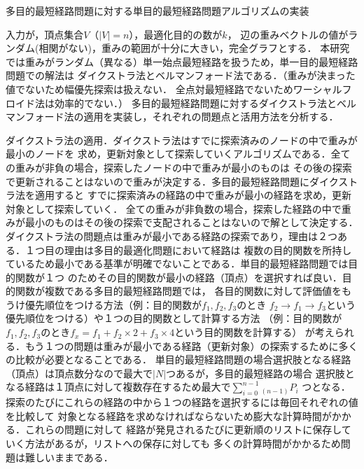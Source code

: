 \documentclass[12pt]{optlab-bachelor}
\begin{document}
\begin{description}
  \item[多目的最短経路問題に対する単目的最短経路問題アルゴリズムの実装]
\end{description}

入力が，頂点集合$V$（$|V|=n$），最適化目的の数が$k$，
辺の重みベクトルの値がランダム(相関がない)，重みの範囲が十分に大きい，完全グラフとする．
本研究では重みがランダム（異なる）単一始点最短経路を扱うため，単一目的最短経路問題での解法は
ダイクストラ法とベルマンフォード法である．（重みが決まった値でないため幅優先探索は扱えない．
全点対最短経路でないためワーシャルフロイド法は効率的でない．）
多目的最短経路問題に対するダイクストラ法とベルマンフォード法の適用を実装し，それぞれの問題点と活用方法を分析する．

ダイクストラ法の適用．ダイクストラ法はすでに探索済みのノードの中で重みが最小のノードを
求め，更新対象として探索していくアルゴリズムである．全ての重みが非負の場合，探索したノードの中で重みが最小のものは
その後の探索で更新されることはないので重みが決定する．多目的最短経路問題にダイクストラ法を適用すると
すでに探索済みの経路の中で重みが最小の経路を求め，更新対象として探索していく．
全ての重みが非負数の場合，探索した経路の中で重みが最小のものはその後の探索で支配されることはないので解として決定する．
ダイクストラ法の問題点は重みが最小である経路の探索であり，理由は２つある．１つ目の理由は多目的最適化問題において経路は
複数の目的関数を所持しているため最小である基準が明確でないことである．単目的最短経路問題では目的関数が１つ
のためその目的関数が最小の経路（頂点）を選択すれば良い．目的関数が複数である多目的最短経路問題では，
各目的関数に対して評価値をもうけ優先順位をつける方法（例：目的関数が$f_1,f_2,f_3$のとき
$f_2 \rightarrow f_1 \rightarrow f_3 $という優先順位をつける）や１つの目的関数として計算する方法
（例：目的関数が$f_1,f_2,f_3$のとき$f_x = f_1 + f_2 \times 2 + f_3 \times 4$という目的関数を計算する）
が考えられる．もう１つの問題は重みが最小である経路（更新対象）の探索するために多くの比較が必要となることである．
単目的最短経路問題の場合選択肢となる経路（頂点）は頂点数分なので最大で$|N|$つあるが，多目的最短経路の場合
選択肢となる経路は１頂点に対して複数存在するため最大で$\displaystyle \sum_{i=0}^{n-1} {}_{(n-1)}P_i$
つとなる．探索のたびにこれらの経路の中から１つの経路を選択するには毎回それぞれの値を比較して
対象となる経路を求めなければならないため膨大な計算時間がかかる．これらの問題に対して
経路が発見されるたびに更新順のリストに保存していく方法があるが，リストへの保存に対しても
多くの計算時間がかかるため問題は難しいままである．
\end{document}
